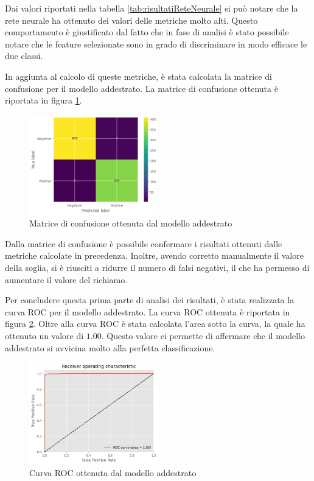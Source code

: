 Dai valori riportati nella tabella \ref{tab:risultatiReteNeurale} si può notare
che la rete neurale ha ottenuto dei valori delle metriche molto alti. Questo 
comportamento è giustificato dal fatto che in fase di analisi è stato possibile
notare che le feature selezionate sono in grado di discriminare in modo efficace
le due classi.

In aggiunta al calcolo di queste metriche, è stata calcolata la matrice di confusione
per il modello addestrato. La matrice di confusione ottenuta è riportata in figura
\ref{fig:matriceConfusioneReteNeurale}.

\begin{figure}[!ht]
    \centering
    \includegraphics[width=0.5\textwidth]{img/rete/matrice_confusione.png}
    \caption{Matrice di confusione ottenuta dal modello addestrato}
    \label{fig:matriceConfusioneReteNeurale}
\end{figure}

Dalla matrice di confusione è possibile confermare i risultati ottenuti dalle
metriche calcolate in precedenza. Inoltre, avendo corretto manualmente il valore
della soglia, si è riusciti a ridurre il numero di falsi negativi, il che ha
permesso di aumentare il valore del richiamo.

Per concludere questa prima parte di analisi dei risultati, è stata realizzata 
la curva ROC per il modello addestrato. La curva ROC ottenuta è riportata in 
figura \ref{fig:curvaRocReteNeurale}. Oltre alla curva ROC è stata calcolata 
l'area sotto la curva, la quale ha ottenuto un valore di $1.00$. Questo valore
ci permette di affermare che il modello addestrato si avvicina molto alla
perfetta classificazione.

\begin{figure}[!ht]
    \centering
    \includegraphics[width=0.5\textwidth]{img/rete/curva_roc.png}
    \caption{Curva ROC ottenuta dal modello addestrato}
    \label{fig:curvaRocReteNeurale}
\end{figure}
